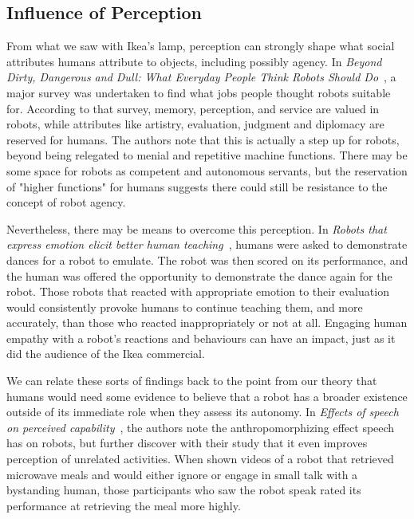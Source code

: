 \documentclass{sfuthesis}
\begin{document}



\subsection{Influence of Perception}

From what we saw with Ikea's lamp, perception can strongly shape what social attributes humans attribute to objects, including possibly agency. In \textit{Beyond Dirty, Dangerous and Dull: What Everyday People Think Robots Should Do}~\cite{takayama2008beyond}, a major survey was undertaken to find what jobs people thought robots suitable for. According to that survey, memory, perception, and service are valued in robots, while attributes like artistry, evaluation, judgment and diplomacy are reserved for humans. The authors note that this is actually a step up for robots, beyond being relegated to menial and repetitive machine functions. There may be some space for robots as competent and autonomous servants, but the reservation of "higher functions" for humans suggests there could still be resistance to the concept of robot agency.

Nevertheless, there may be means to overcome this perception. In \textit{Robots that express emotion elicit better human teaching}~\cite{leyzberg2011robots}, humans were asked to demonstrate dances for a robot to emulate. The robot was then scored on its performance, and the human was offered the opportunity to demonstrate the dance again for the robot. Those robots that reacted with appropriate emotion to their evaluation would consistently provoke humans to continue teaching them, and more accurately, than those who reacted inappropriately or not at all. Engaging human empathy with a robot's reactions and behaviours can have an impact, just as it did the audience of the Ikea commercial.

We can relate these sorts of findings back to the point from our theory that humans would need some evidence to believe that a robot has a broader existence outside of its immediate role when they assess its autonomy. In \textit{Effects of speech on perceived capability}~\cite{cha2014effects}, the authors note the anthropomorphizing effect speech has on robots, but further discover with their study that it even improves perception of unrelated activities. When shown videos of a robot that retrieved microwave meals and would either ignore or engage in small talk with a bystanding human, those participants who saw the robot speak rated its performance at retrieving the meal more highly. 
\end{document}
